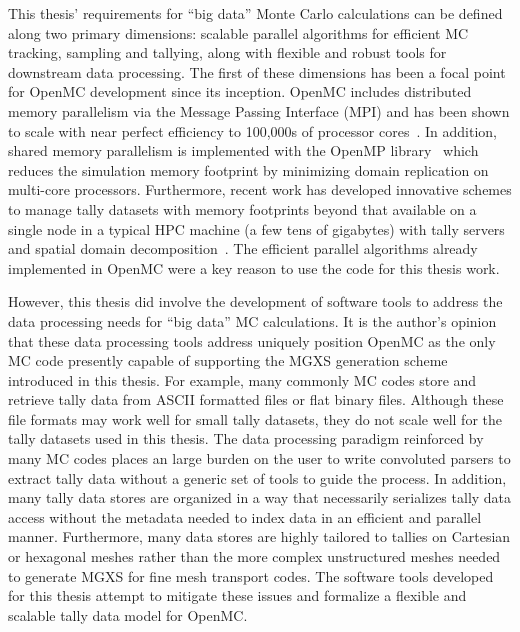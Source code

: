 This thesis' requirements for ``big data'' Monte Carlo calculations can be defined along two primary dimensions: scalable parallel algorithms for efficient \ac{MC} tracking, sampling and tallying, along with flexible and robust tools for downstream data processing. The first of these dimensions has been a focal point for OpenMC development since its inception. OpenMC includes distributed memory parallelism via the Message Passing Interface (MPI) and has been shown to scale with near perfect efficiency to 100,000s of processor cores~\cite{romano2013parallel}. In addition, shared memory parallelism is implemented with the OpenMP library~\cite{siegel2014multi} which reduces the simulation memory footprint by minimizing domain replication on multi-core processors. Furthermore, recent work has developed innovative schemes to manage tally datasets with memory footprints beyond that available on a single node in a typical \ac{HPC} machine (a few tens of gigabytes) with tally servers~\cite{romano2013servers} and spatial domain decomposition~\cite{horelik2014dd}. The efficient parallel algorithms already implemented in OpenMC were a key reason to use the code for this thesis work.

However, this thesis did involve the development of software tools to address the data processing needs for ``big data'' \ac{MC} calculations. It is the author's opinion that these data processing tools address uniquely position OpenMC as the only \ac{MC} code presently capable of supporting the \ac{MGXS} generation scheme introduced in this thesis. For example, many commonly \ac{MC} codes store and retrieve tally data from \ac{ASCII} formatted files or flat binary files. Although these file formats may work well for small tally datasets, they do not scale well for the tally datasets used in this thesis. The data processing paradigm reinforced by many \ac{MC} codes places an large burden on the user to write convoluted parsers to extract tally data without a generic set of tools to guide the process. In addition, many tally data stores are organized in a way that necessarily serializes tally data access without the metadata needed to index data in an efficient and parallel manner. Furthermore, many data stores are highly tailored to tallies on Cartesian or hexagonal meshes rather than the more complex unstructured meshes needed to generate \ac{MGXS} for fine mesh transport codes. The software tools developed for this thesis attempt to mitigate these issues and formalize a flexible and scalable tally data model for OpenMC.

